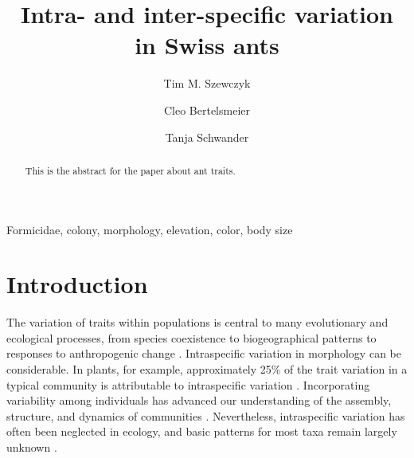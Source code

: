 \documentclass[review,preprint,3p]{elsarticle}
\begin{document}
	
	\begin{frontmatter}
		
		\title{Intra- and inter-specific variation in Swiss ants}
		
		\author[DEE]{Tim M. Szewczyk}
		\author[DEE]{Cleo Bertelsmeier}
		\author[DEE]{Tanja Schwander}

		\address[DEE]{Department of Ecology and Evolution, University of Lausanne}

		
		\begin{abstract}
			This is the abstract for the paper about ant traits.
		\end{abstract}
		
		\begin{keyword}
			Formicidae, colony, morphology, elevation, color, body size
		\end{keyword}
		
	\end{frontmatter}
	
	\linenumbers
	
	\section{Introduction}
	The variation of traits within populations is central to many evolutionary and ecological processes, from species coexistence \cite{Violle2012a} to biogeographical patterns \cite{Classen2017} to responses to anthropogenic change \cite{Moran2016,Merckx2018}. Intraspecific variation in morphology can be considerable. In plants, for example, approximately 25\% of the trait variation in a typical community is attributable to intraspecific variation \cite{Siefert2015}. Incorporating variability among individuals has advanced our understanding of the assembly, structure, and dynamics of communities \cite{Jung2010,Laughlin2012}. Nevertheless, intraspecific variation has often been neglected in ecology, and basic patterns for most taxa remain largely unknown \cite{Bolnick2011,Violle2012a,Wong2019}.
	
\end{document}
